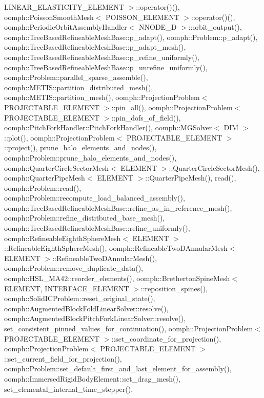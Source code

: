 L\+I\+N\+E\+A\+R\+\_\+\+E\+L\+A\+S\+T\+I\+C\+I\+T\+Y\+\_\+\+E\+L\+E\+M\+E\+N\+T $>$\+::operator()(), oomph\+::\+Poisson\+Smooth\+Mesh$<$ P\+O\+I\+S\+S\+O\+N\+\_\+\+E\+L\+E\+M\+E\+N\+T $>$\+::operator()(), oomph\+::\+Periodic\+Orbit\+Assembly\+Handler$<$ N\+N\+O\+D\+E\+\_\+D $>$\+::orbit\+\_\+output(), oomph\+::\+Tree\+Based\+Refineable\+Mesh\+Base\+::p\+\_\+adapt(), oomph\+::\+Problem\+::p\+\_\+adapt(), oomph\+::\+Tree\+Based\+Refineable\+Mesh\+Base\+::p\+\_\+adapt\+\_\+mesh(), oomph\+::\+Tree\+Based\+Refineable\+Mesh\+Base\+::p\+\_\+refine\+\_\+uniformly(), oomph\+::\+Tree\+Based\+Refineable\+Mesh\+Base\+::p\+\_\+unrefine\+\_\+uniformly(), oomph\+::\+Problem\+::parallel\+\_\+sparse\+\_\+assemble(), oomph\+::\+M\+E\+T\+I\+S\+::partition\+\_\+distributed\+\_\+mesh(), oomph\+::\+M\+E\+T\+I\+S\+::partition\+\_\+mesh(), oomph\+::\+Projection\+Problem$<$ P\+R\+O\+J\+E\+C\+T\+A\+B\+L\+E\+\_\+\+E\+L\+E\+M\+E\+N\+T $>$\+::pin\+\_\+all(), oomph\+::\+Projection\+Problem$<$ P\+R\+O\+J\+E\+C\+T\+A\+B\+L\+E\+\_\+\+E\+L\+E\+M\+E\+N\+T $>$\+::pin\+\_\+dofs\+\_\+of\+\_\+field(), oomph\+::\+Pitch\+Fork\+Handler\+::\+Pitch\+Fork\+Handler(), oomph\+::\+M\+G\+Solver$<$ D\+I\+M $>$\+::plot(), oomph\+::\+Projection\+Problem$<$ P\+R\+O\+J\+E\+C\+T\+A\+B\+L\+E\+\_\+\+E\+L\+E\+M\+E\+N\+T $>$\+::project(), prune\+\_\+halo\+\_\+elements\+\_\+and\+\_\+nodes(), oomph\+::\+Problem\+::prune\+\_\+halo\+\_\+elements\+\_\+and\+\_\+nodes(), oomph\+::\+Quarter\+Circle\+Sector\+Mesh$<$ E\+L\+E\+M\+E\+N\+T $>$\+::\+Quarter\+Circle\+Sector\+Mesh(), oomph\+::\+Quarter\+Pipe\+Mesh$<$ E\+L\+E\+M\+E\+N\+T $>$\+::\+Quarter\+Pipe\+Mesh(), read(), oomph\+::\+Problem\+::read(), oomph\+::\+Problem\+::recompute\+\_\+load\+\_\+balanced\+\_\+assembly(), oomph\+::\+Tree\+Based\+Refineable\+Mesh\+Base\+::refine\+\_\+as\+\_\+in\+\_\+reference\+\_\+mesh(), oomph\+::\+Problem\+::refine\+\_\+distributed\+\_\+base\+\_\+mesh(), oomph\+::\+Tree\+Based\+Refineable\+Mesh\+Base\+::refine\+\_\+uniformly(), oomph\+::\+Refineable\+Eighth\+Sphere\+Mesh$<$ E\+L\+E\+M\+E\+N\+T $>$\+::\+Refineable\+Eighth\+Sphere\+Mesh(), oomph\+::\+Refineable\+Two\+D\+Annular\+Mesh$<$ E\+L\+E\+M\+E\+N\+T $>$\+::\+Refineable\+Two\+D\+Annular\+Mesh(), oomph\+::\+Problem\+::remove\+\_\+duplicate\+\_\+data(), oomph\+::\+H\+S\+L\+\_\+\+M\+A42\+::reorder\+\_\+elements(), oomph\+::\+Bretherton\+Spine\+Mesh$<$ E\+L\+E\+M\+E\+N\+T, I\+N\+T\+E\+R\+F\+A\+C\+E\+\_\+\+E\+L\+E\+M\+E\+N\+T $>$\+::reposition\+\_\+spines(), oomph\+::\+Solid\+I\+C\+Problem\+::reset\+\_\+original\+\_\+state(), oomph\+::\+Augmented\+Block\+Fold\+Linear\+Solver\+::resolve(), oomph\+::\+Augmented\+Block\+Pitch\+Fork\+Linear\+Solver\+::resolve(), set\+\_\+consistent\+\_\+pinned\+\_\+values\+\_\+for\+\_\+continuation(), oomph\+::\+Projection\+Problem$<$ P\+R\+O\+J\+E\+C\+T\+A\+B\+L\+E\+\_\+\+E\+L\+E\+M\+E\+N\+T $>$\+::set\+\_\+coordinate\+\_\+for\+\_\+projection(), oomph\+::\+Projection\+Problem$<$ P\+R\+O\+J\+E\+C\+T\+A\+B\+L\+E\+\_\+\+E\+L\+E\+M\+E\+N\+T $>$\+::set\+\_\+current\+\_\+field\+\_\+for\+\_\+projection(), oomph\+::\+Problem\+::set\+\_\+default\+\_\+first\+\_\+and\+\_\+last\+\_\+element\+\_\+for\+\_\+assembly(), oomph\+::\+Immersed\+Rigid\+Body\+Element\+::set\+\_\+drag\+\_\+mesh(), set\+\_\+elemental\+\_\+internal\+\_\+time\+\_\+stepper(), 